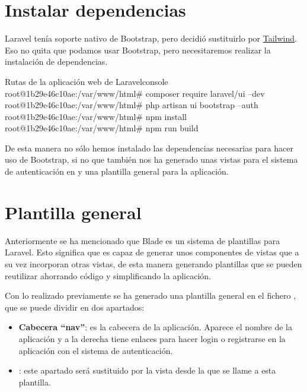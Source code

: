 \chapter{Instalar dependencias}

Laravel tenía soporte nativo de Bootstrap, pero decidió sustituirlo por \href{https://tailwindcss.com/}{Tailwind}. Eso no quita que podamos usar Bootstrap, pero necesitaremos realizar la instalación de dependencias.

\begin{mycode}{Rutas de la aplicación web de Laravel}{console}{}
root@1b29e46c10ae:/var/www/html# composer require laravel/ui --dev
root@1b29e46c10ae:/var/www/html# php artisan ui bootstrap --auth
root@1b29e46c10ae:/var/www/html# npm install
root@1b29e46c10ae:/var/www/html# npm run build
\end{mycode}

De esta manera no sólo hemos instalado las dependencias necesarias para hacer uso de Bootstrap, si no que también nos ha generado unas vistas para el sistema de autenticación en  y una plantilla general para la aplicación.


\chapter{Plantilla general}

Anteriormente se ha mencionado que Blade es un sistema de plantillas para Laravel. Esto significa que es capaz de generar unos componentes de vistas que a su vez incorporan otras vistas, de esta manera generando plantillas que se pueden reutilizar ahorrando código y simplificando la aplicación.

Con lo realizado previamente se ha generado una plantilla general en el fichero , que se puede dividir en dos apartados:

\begin{itemize}
    \item \textbf{Cabecera “nav”}: es la cabecera de la aplicación. Aparece el nombre de la aplicación y a la derecha tiene enlaces para hacer login o registrarse en la aplicación con el sistema de autenticación.

    \item {}: este apartado será sustituido por la vista desde la que se llame a esta plantilla.
\end{itemize}

